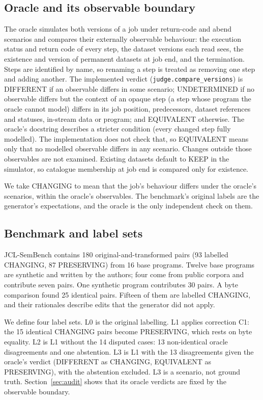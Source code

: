 \documentclass[conference]{IEEEtran}
\begin{document}
\subsection{Oracle and its observable boundary}
The oracle simulates both versions of a job under return-code and abend scenarios and compares their externally observable behaviour: the execution status and return code of every step, the dataset versions each read sees, the existence and version of permanent datasets at job end, and the termination. Steps are identified by name, so renaming a step is treated as removing one step and adding another. The implemented verdict (\texttt{judge.compare\_versions}) is DIFFERENT if an observable differs in some scenario; UNDETERMINED if no observable differs but the context of an opaque step (a step whose program the oracle cannot model) differs in its job position, predecessors, dataset references and statuses, in-stream data or program; and EQUIVALENT otherwise. The oracle's docstring describes a stricter condition (every changed step fully modelled). The implementation does not check that, so EQUIVALENT means only that no modelled observable differs in any scenario. Changes outside those observables are not examined. Existing datasets default to KEEP in the simulator, so catalogue membership at job end is compared only for existence.

We take CHANGING to mean that the job's behaviour differs under the oracle's scenarios, within the oracle's observables. The benchmark's original labels are the generator's expectations, and the oracle is the only independent check on them.

\subsection{Benchmark and label sets}\label{sec:labels}
JCL-SemBench contains 180 original-and-transformed pairs (93 labelled CHANGING, 87 PRESERVING) from 16 base programs. Twelve base programs are synthetic and written by the authors; four come from public corpora and contribute seven pairs. One synthetic program contributes 30 pairs. A byte comparison found 25 identical pairs. Fifteen of them are labelled CHANGING, and their rationales describe edits that the generator did not apply.

We define four label sets. L0 is the original labelling. L1 applies correction C1: the 15 identical CHANGING pairs become PRESERVING, which rests on byte equality. L2 is L1 without the 14 disputed cases: 13 non-identical oracle disagreements and one abstention. L3 is L1 with the 13 disagreements given the oracle's verdict (DIFFERENT as CHANGING, EQUIVALENT as PRESERVING), with the abstention excluded. L3 is a scenario, not ground truth. Section~\ref{sec:audit} shows that its oracle verdicts are fixed by the observable boundary.
\end{document}
